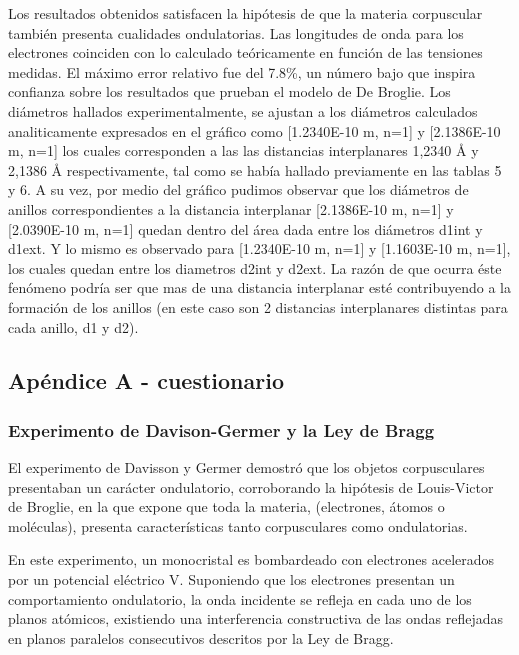 \documentclass[]{article}
\begin{document}
Los resultados obtenidos satisfacen la hipótesis de que la materia
corpuscular también presenta cualidades ondulatorias. Las longitudes de
onda para los electrones coinciden con lo calculado teóricamente en
función de las tensiones medidas. El máximo error relativo fue del
7.8\%, un número bajo que inspira confianza sobre los resultados que
prueban el modelo de De Broglie. Los diámetros hallados
experimentalmente, se ajustan a los diámetros calculados analiticamente
expresados en el gráfico como {[}1.2340E-10 m, n=1{]} y {[}2.1386E-10 m,
n=1{]} los cuales corresponden a las las distancias interplanares 1,2340
Å y 2,1386 Å respectivamente, tal como se había hallado previamente en
las tablas 5 y 6. A su vez, por medio del gráfico pudimos observar que
los diámetros de anillos correspondientes a la distancia interplanar
{[}2.1386E-10 m, n=1{]} y {[}2.0390E-10 m, n=1{]} quedan dentro del área
dada entre los diámetros d1int y d1ext. Y lo mismo es observado para
{[}1.2340E-10 m, n=1{]} y {[}1.1603E-10 m, n=1{]}, los cuales quedan
entre los diametros d2int y d2ext. La razón de que ocurra éste fenómeno
podría ser que mas de una distancia interplanar esté contribuyendo a la
formación de los anillos (en este caso son 2 distancias interplanares
distintas para cada anillo, d1 y d2).

\hypertarget{apuxe9ndice-a---cuestionario}{%
\subsection{Apéndice A -
cuestionario}\label{apuxe9ndice-a---cuestionario}}

\hypertarget{experimento-de-davison-germer-y-la-ley-de-bragg}{%
\subsubsection{Experimento de Davison-Germer y la Ley de
Bragg}\label{experimento-de-davison-germer-y-la-ley-de-bragg}}

El experimento de Davisson y Germer demostró que los objetos
corpusculares presentaban un carácter ondulatorio, corroborando la
hipótesis de Louis-Victor de Broglie, en la que expone que toda la
materia, (electrones, átomos o moléculas), presenta características
tanto corpusculares como ondulatorias.

En este experimento, un monocristal es bombardeado con electrones
acelerados por un potencial eléctrico V. Suponiendo que los electrones
presentan un comportamiento ondulatorio, la onda incidente se refleja en
cada uno de los planos atómicos, existiendo una interferencia
constructiva de las ondas reflejadas en planos paralelos consecutivos
descritos por la Ley de Bragg.
\end{document}
